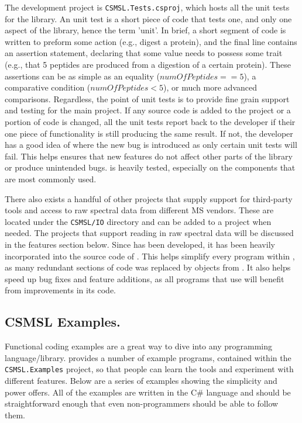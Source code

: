 The development project is \texttt{CSMSL.Tests.csproj}, which hosts all the unit tests for the library. An unit test is a short piece of code that tests one, and only one aspect of the library, hence the term 'unit'. In brief, a short segment of code is written to preform some action (e.g., digest a protein), and the final line contains an assertion statement, declaring that some value needs to possess some trait (e.g., that 5 peptides are produced from a digestion of a certain protein). These assertions can be as simple as an equality ($numOfPeptides == 5$), a comparative condition ($numOfPeptides < 5$), or much more advanced comparisons. Regardless, the point of unit tests is to provide fine grain support and testing for the main project. If any source code is added to the project or a portion of code is changed, all the unit tests report back to the developer if their one piece of functionality is still producing the same result. If not, the developer has a good idea of where the new bug is introduced as only certain unit tests will fail. This helps ensures that new features do not affect other parts of the library or produce unintended bugs. \csmsl{} is heavily tested, especially on the components that are most commonly used.

There also exists a handful of other projects that supply support for third-party tools and access to raw spectral data from different MS vendors. These are located under the \texttt{CSMSL/IO} directory and can be added to a project when needed. The projects that support reading in raw spectral data will be discussed in the features section below. Since \csmsl{} has been developed, it has been heavily incorporated into the source code of \compass{}. This helps simplify every program within \compass{}, as many redundant sections of code was replaced by objects from \csmsl{}. It also helps speed up bug fixes and feature additions, as all programs that use \csmsl{} will benefit from improvements in its code.

\subsection*{CSMSL Examples.}
Functional coding examples are a great way to dive into any programming language/library. \csmsl{} provides a number of example programs, contained within the \texttt{CSMSL.Examples} project, so that people can learn the tools and experiment with different features. Below are a series of examples showing the simplicity and power \csmsl{} offers. All of the examples are written in the C\# language and should be straightforward enough that even non-programmers should be able to follow them.

